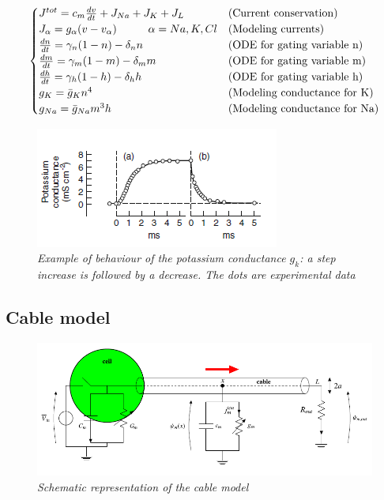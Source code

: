 \documentclass[a4paper]{article}
\begin{document}
\begin{equation}
\begin{cases}
J^{tot} = c_m \frac{d v}{d t} + J_{Na} + J_K +J_L  & \text{(Current conservation)}\\
J_\alpha = g_\alpha (v-v_\alpha) \hspace{1 cm}  \alpha = Na,K,Cl & \text{(Modeling currents)}\\
\frac{dn}{dt} = \gamma_n(1-n) - \delta_n n & \text{(ODE for gating variable n)} \\
\frac{dm}{dt} = \gamma_m(1-m) - \delta_m m & \text{(ODE for gating variable m)}\\
\frac{dh}{dt} = \gamma_h(1-h) - \delta_h h & \text{(ODE for gating variable h)}\\
g_K = \bar{g}_K n^4 & \text{(Modeling conductance for K)}\\
g_{Na} = \bar{g}_{Na} m^3h  & \text{(Modeling conductance for Na)}

\end{cases}
\end{equation}

\begin{figure}[H]
	\begin{center}
		\includegraphics[scale=1.1]{gk.png} 
	\end{center} 
	\caption{\textit{Example of behaviour of the potassium conductance $g_k$: a step increase is followed by a decrease. The dots are experimental data}}
	
\end{figure}


\subsection{Cable model}

\begin{figure}[H]
	\begin{center}
		\hspace*{-0.7cm}
		\includegraphics[scale=0.7]{cable.png} 
	\end{center} 
	\caption{\textit{Schematic representation of the cable model}}
	
\end{figure}
\end{document}
